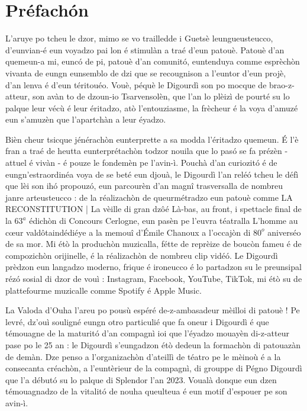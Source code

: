 
\chapter*{Préfach\'on}
L’aruye po tcheu le dzor, mimo se vo trailledde i Guetsè leungueusteucco, d’eunvian-é eun voyadzo  pai lon é stimulàn a traé d’eun patouè. Patouè d’an quemeun-a mi, euncó de pi, patouè d’an comunitó, euntenduya comme esprèchòn vivanta de eungn eunsemblo de dzi que se recougnison a l’euntor d’eun projè, d’an lenva é d’eun téritouéo. Vouè, péquè le Digourdì son po mocque de brao-z-atteur, son avàn to de dzou\-n-io Tsarvensolèn, que l’an lo plèizì de pourté su lo palque leur vécù é leur éritadzo, atò l’entouziasme, la frècheur é la voya d’amuzé eun s’amuzèn que l’apartchàn a leur éyadzo.
 
Bièn cheur tsicque jénérachòn eunterprette a sa modda l’éritadzo quemeun. É l’è fran a traé de heutta eunterprétachòn todzor nouila que lo pasó se fa prézèn - attuel é vivàn - é pouze le fondemèn pe l’avin-ì.  Pouchà d’an curiozitó é de eungn’estraordinéa voya de se beté eun djouà, le Digourdì l’an reléó tcheu le défì que lèi son ihó propouzó, eun parcourèn d’an magnî trasversalla de nombreu janre arteusteucco : de la réalizachòn de queurmétradzo eun patouè comme \og LA RECONSTITUTION | La vèille di gran dz\^o\fg é \og Là-bas, au front\fg, i spettacle final de la $63^a$ édichòn di Concours Cerlogne, eun pasèn pe l’euvra téatralla \og L’homme au cœur valdôtain\fg dédiéye a la memouî d’Émile Chanoux a l’occajòn di $80^o$ aniverséo de sa mor. Mi étò la produchòn muzicalla, fétte de reprèize de boucòn fameu é de compozichòn orijinelle, é la réalizachòn de nombreu clip vidéó. Le Digourdì prèdzon eun langadzo moderno, frique é ironeucco é lo partadzon su le preunsipal rézó sosial di dzor de vouì : Instagram, Facebook, YouTube, TikTok, mi étò su de plattefourme muzicalle comme Spotify é Apple Music. 

La Valoda d’Ouha l’areu po pousù espéré de-z-ambasadeur mè\-illo\-i di patouè ! 
Pe levré, dz’ouì souligné eungn otro particulié que fa oneur i Digourdì é que témouagne de la maturitó d’an compagnì ioi que l’éyadzo mouayèn di-z-atteur pase po le 25 an : le Digourdì s’eungadzon étò dedeun la formachòn di patouazàn de demàn. Dze penso a l’organizachòn d’ateillì de téatro pe le mèinoù é a la consecanta créachòn, a l’euntèrieur de la compagnì, di grouppe di Pégno Digourdì que l’a débutó su lo palque di Splendor l’an 2023.
Voualà donque eun dzen témouagnadzo de la vitalitó de nouha queulteua é eun motif d’espouer pe son avin-ì.

